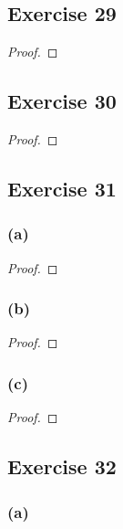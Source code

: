 \documentclass[14pt]{extarticle}
\begin{document}
\subsection{Exercise 29}

\begin{proof}

\end{proof}

\subsection{Exercise 30}

\begin{proof}

\end{proof}

\subsection{Exercise 31}

\subsubsection{(a)}

\begin{proof}

\end{proof}

\subsubsection{(b)}

\begin{proof}

\end{proof}

\subsubsection{(c)}

\begin{proof}

\end{proof}

\subsection{Exercise 32}

\subsubsection{(a)}
\end{document}
